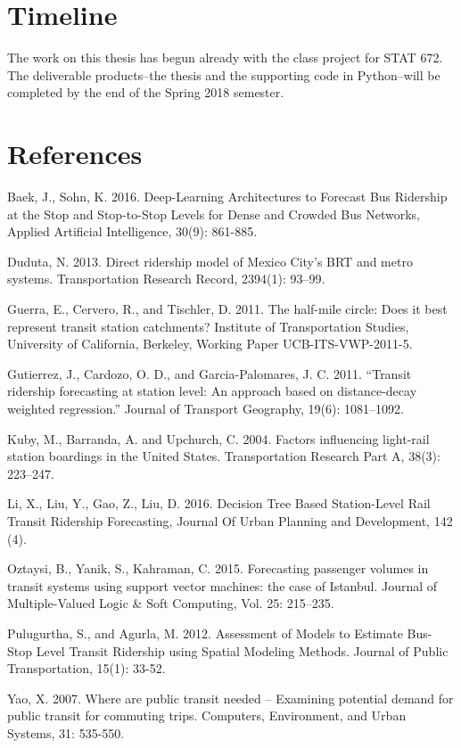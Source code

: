\documentclass{article}
\begin{document}
\section{Timeline}

The work on this thesis has begun already with the class project for STAT 672. The deliverable products--the thesis and the supporting code in Python--will be completed by the end of the Spring 2018 semester. 

\section{References}

Baek, J., Sohn, K. 2016. Deep-Learning Architectures to Forecast Bus Ridership at the Stop and Stop-to-Stop Levels for Dense and Crowded Bus Networks, Applied Artificial Intelligence, 30(9): 861-885.

Duduta, N. 2013. Direct ridership model of Mexico City’s BRT and metro systems. Transportation Research Record, 2394(1): 93–99.

Guerra, E., Cervero, R., and Tischler, D. 2011. The half-mile circle: Does it best represent transit station catchments? Institute of Transportation Studies, University of California, Berkeley, Working Paper UCB-ITS-VWP-2011-5.

Gutierrez, J., Cardozo, O. D., and Garcia-Palomares, J. C. 2011. “Transit ridership forecasting at station level: An approach based on distance-decay weighted regression.” Journal of Transport Geography, 19(6): 1081–1092.

Kuby, M., Barranda, A. and Upchurch, C. 2004. Factors influencing light-rail station boardings in the United States. Transportation Research Part A, 38(3): 223–247.

Li, X., Liu, Y., Gao, Z., Liu, D. 2016. Decision Tree Based Station-Level Rail Transit Ridership Forecasting, Journal Of Urban Planning and Development, 142 (4).

Oztaysi, B., Yanik, S.,  Kahraman, C. 2015. Forecasting passenger volumes in transit systems using support vector machines: the case of Istanbul. Journal of Multiple-Valued Logic \& Soft Computing, Vol. 25: 215–235.

Pulugurtha, S., and Agurla, M. 2012. Assessment of Models to Estimate Bus-Stop Level Transit Ridership using Spatial Modeling Methods. Journal of Public Transportation, 15(1): 33-52.

Yao, X. 2007. Where are public transit needed -- Examining potential demand for public transit for commuting trips. Computers, Environment, and Urban Systems, 31: 535-550.
\end{document}
